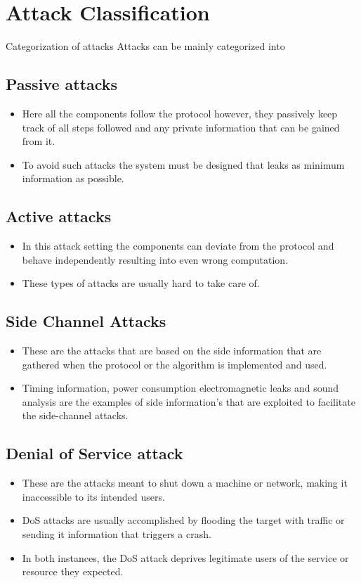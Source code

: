 
\chapter{Attack Classification}
\setcounter{section}{0}


Categorization of attacks
Attacks can be mainly categorized into

\section{Passive attacks}
\begin{itemize}
    \item Here all the components follow the protocol however, they passively keep track of all steps followed and any private information that can be gained from it.
    \item To avoid such attacks the system must be designed that leaks as minimum information as possible.
\end{itemize}

\section{Active attacks}
\begin{itemize}
    \item In this attack setting the components can deviate from the protocol and behave independently resulting into even wrong computation.
    \item These types of attacks are usually hard to take care of.
\end{itemize}

\section{Side Channel Attacks}
\begin{itemize}
    \item These are the attacks that are based on the side information that are gathered when the protocol or the algorithm is implemented and used.
    \item Timing information, power consumption electromagnetic leaks and sound analysis are the examples of side information’s that are exploited to facilitate the side-channel attacks.
\end{itemize}

\section{Denial of Service attack}
\begin{itemize}
    \item These are the attacks meant to shut down a machine or network, making it inaccessible to its intended users.
    \item DoS attacks are usually accomplished by flooding the target with traffic or sending it information that triggers a crash.
    \item In both instances, the DoS attack deprives legitimate users of the service or resource they expected.
\end{itemize}

